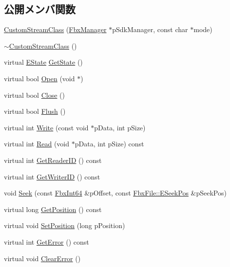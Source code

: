 \subsection*{公開メンバ関数}
\begin{DoxyCompactItemize}
\item 
\hyperlink{class_custom_stream_class_ad41bc5e727544febeb587de0717126fc}{Custom\+Stream\+Class} (\hyperlink{class_fbx_manager}{Fbx\+Manager} $\ast$p\+Sdk\+Manager, const char $\ast$mode)
\item 
\hyperlink{class_custom_stream_class_a7bf1141f1e3a335cbe1c88f15c6e3cb1}{$\sim$\+Custom\+Stream\+Class} ()
\item 
virtual \hyperlink{class_fbx_stream_adc469d38eb30339fa4190eb6c66ec8f7}{E\+State} \hyperlink{class_custom_stream_class_a75de6f5f3a8ea2d51a40ebfa34f20448}{Get\+State} ()
\item 
virtual bool \hyperlink{class_custom_stream_class_ade734834eb279b5b3fde05b6fb3cb352}{Open} (void $\ast$)
\item 
virtual bool \hyperlink{class_custom_stream_class_a8871348021c69d6912a12298626195f6}{Close} ()
\item 
virtual bool \hyperlink{class_custom_stream_class_a4b5d2980af50604d2cb5ec900ef8488a}{Flush} ()
\item 
virtual int \hyperlink{class_custom_stream_class_a952b5466395a669fb9f8458faf2f3046}{Write} (const void $\ast$p\+Data, int p\+Size)
\item 
virtual int \hyperlink{class_custom_stream_class_a4b1260bd3c889278862f794ca9280bcb}{Read} (void $\ast$p\+Data, int p\+Size) const
\item 
virtual int \hyperlink{class_custom_stream_class_a7587c69f5f569528a3084d3919fa21f9}{Get\+Reader\+ID} () const
\item 
virtual int \hyperlink{class_custom_stream_class_a4fec56a5a7f65604c6e3eb2ce66fb3fb}{Get\+Writer\+ID} () const
\item 
void \hyperlink{class_custom_stream_class_aa4b267f0e7bb68f020bf53ac3a7a316e}{Seek} (const \hyperlink{fbxtypes_8h_ac7e1334c7c6aacc9c8a9dccddebb4368}{Fbx\+Int64} \&p\+Offset, const \hyperlink{class_fbx_file_aba91fe59f9c0a4c84a92f13c0c27deec}{Fbx\+File\+::\+E\+Seek\+Pos} \&p\+Seek\+Pos)
\item 
virtual long \hyperlink{class_custom_stream_class_ad8b406d43faa137290bf9527badeb27d}{Get\+Position} () const
\item 
virtual void \hyperlink{class_custom_stream_class_a93d790e1ed854c5383b7854719e2f2c8}{Set\+Position} (long p\+Position)
\item 
virtual int \hyperlink{class_custom_stream_class_a127e5bdb249b98bf93fb50b3731747a6}{Get\+Error} () const
\item 
virtual void \hyperlink{class_custom_stream_class_a4eb6319d8b82c6f520465e90f0165449}{Clear\+Error} ()
\end{DoxyCompactItemize}
